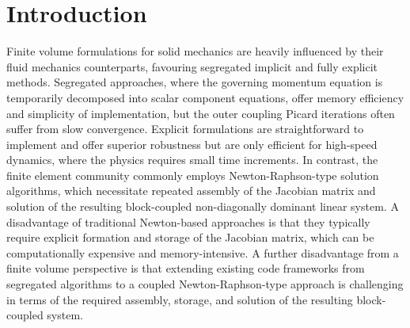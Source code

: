 \documentclass[sn-mathphys,Numbered]{sn-jnl}%
\begin{document}

\maketitle


\section{Introduction}\label{sec:intro}
%
Finite volume formulations for solid mechanics are heavily influenced by their fluid mechanics counterparts, favouring segregated implicit and fully explicit methods.
Segregated approaches, where the governing momentum equation is temporarily decomposed into scalar component equations, offer memory efficiency and simplicity of implementation, but the outer coupling Picard iterations often suffer from slow convergence.
Explicit formulations are straightforward to implement and offer superior robustness but are only efficient for high-speed dynamics, where the physics requires small time increments.
In contrast, the finite element community commonly employs Newton-Raphson-type solution algorithms, which necessitate repeated assembly of the Jacobian matrix and solution of the resulting block-coupled non-diagonally dominant linear system.
A disadvantage of traditional Newton-based approaches is that they typically require explicit formation and storage of the Jacobian matrix, which can be computationally expensive and memory-intensive.
A further disadvantage from a finite volume perspective is that extending existing code frameworks from segregated algorithms to a coupled Newton-Raphson-type approach is challenging in terms of the required assembly, storage, and solution of the resulting block-coupled system.
\end{document}
